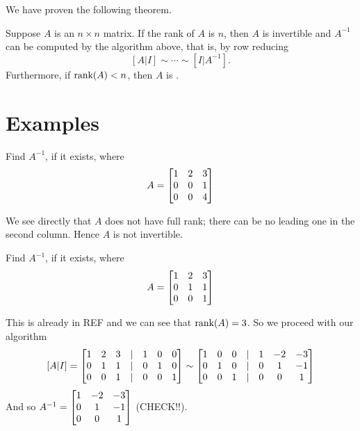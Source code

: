 We have proven the following theorem.

\begin{theorem}
Suppose $A$ is an $n \times n$ matrix.  If the rank of $A$ is $n$,
then $A$ is invertible and $A^{-1}$ can be computed by the
algorithm above, that is, by row reducing
$$
[A | I] \sim \cdots \sim [I | A^{-1}].
$$
Furthermore, if $\textrm{rank}(A) < n$, then $A$ is .
\end{theorem}

\section{Examples}

\begin{myprob} Find $A^{-1}$, if it exists, where 
$$
A = \left[ \begin{matrix} 1 & 2 & 3 \\ 0 & 0 & 1\\ 0 & 0 & 4 \end{matrix} \right]
$$

\begin{mysol} We see directly that $A$ does not have full rank; there can
be no leading one in the second column.  Hence $A$ is not invertible.
\end{mysol}\end{myprob}

\begin{myprob} Find $A^{-1}$, if it exists, where 
$$
A = \left[ \begin{matrix} 1 & 2 & 3 \\ 0 & 1 & 1\\ 0 & 0 & 1 \end{matrix} \right]
$$

\begin{mysol} This is already in REF and we can see that $\textrm{rank}(A) = 3$.
So we proceed with our algorithm
$$
[A|I] = \left[ \begin{matrix} 1 & 2 & 3 &|&1&0&0\\ 0 & 1 & 1&|& 0&1&0\\ 0 & 0 & 1&|&0 & 0 & 1 \end{matrix} \right]
\sim
\left[ \begin{matrix} 
1 & 0 & 0 &|& 1 & -2 & -3\\ 
0 & 1 & 0 &|& 0 & 1 & -1\\ 
0 & 0 & 1 &|& 0 & 0 & 1 \end{matrix} \right]
$$
And so $A^{-1} = \left[ \begin{matrix} 1 & -2 & -3\\ 
 0 & 1 & -1\\ 
 0 & 0 & 1 \end{matrix} \right]$
(CHECK!!). \end{mysol}\end{myprob}

